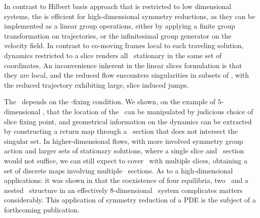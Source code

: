 In contrast to Hilbert basis approach that is restricted to
low dimensional systems, the {\mframes} is efficient for
high-dimensional symmetry reductions, as they can be
implemented as a linear group operations, either by applying
a finite group transformation on trajectories, or the
infinitesimal group generator on the velocity field. In
contrast to co-moving frames local to each traveling
solution, dynamics restricted to a slice renders all \reqva\
stationary in the same set of coordinates. An inconvenience
inherent in the linear slices formulation is that they are
local, and the reduced flow encounters singularities in
subsets of \reducedsp, with the reduced trajectory exhibiting
large, slice induced jumps.

The \sset\ depends on the \slice-fixing condition. We shown,
on the example of $5$-dimensional \cLe, that the location of
the \sset\ can be manipulated by judicious choice of slice
fixing point, and geometrical information on the dynamics can
be extracted by constructing a return map through a
\Poincare\ section that does not intersect the singular set.
In higher-dimensional flows, with more involved symmetry
group action and larger sets of stationary solutions, where a
single slice and \Poincare\ section would not suffice, we can
still expect to cover \reducedsp\ with multiple slices,
obtaining a set of discrete maps involving multiple
\Poincare\ sections. As to a high-dimensional applications:
it was shown in  that the coexistence
of four equilibria, two \reqva\ and a nested \fixedsp\
structure in an effectively $8$-dimensional \KS\
system complicates matters considerably. This
application of symmetry reduction of a PDE is the
subject of a forthcoming publication\rf{SCD09b}.
